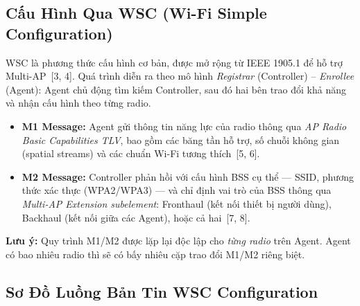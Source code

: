 \subsection{Cấu Hình Qua WSC (Wi-Fi Simple Configuration)}

WSC là phương thức cấu hình cơ bản, được mở rộng từ IEEE 1905.1 để hỗ trợ Multi-AP~[3, 4].
Quá trình diễn ra theo mô hình \textit{Registrar} (Controller) -- \textit{Enrollee} (Agent):
Agent chủ động tìm kiếm Controller, sau đó hai bên trao đổi khả năng và nhận cấu hình
theo từng radio.

\begin{itemize}
	\item \textbf{M1 Message:} Agent gửi thông tin năng lực của radio thông qua
	\textit{AP Radio Basic Capabilities TLV}, bao gồm các băng tần hỗ trợ, số
	chuỗi không gian (spatial streams) và các chuẩn Wi-Fi tương thích~[5, 6].
	\item \textbf{M2 Message:} Controller phản hồi với cấu hình BSS cụ thể --- SSID,
	phương thức xác thực (WPA2/WPA3) --- và chỉ định vai trò của BSS thông qua
	\textit{Multi-AP Extension subelement}: Fronthaul (kết nối thiết bị người dùng),
	Backhaul (kết nối giữa các Agent), hoặc cả hai~[7, 8].
\end{itemize}

\textbf{Lưu ý:} Quy trình M1/M2 được lặp lại độc lập cho \textit{từng radio} trên Agent.
Agent có bao nhiêu radio thì sẽ có bấy nhiêu cặp trao đổi M1/M2 riêng biệt.


\subsection{Sơ Đồ Luồng Bản Tin WSC Configuration}

